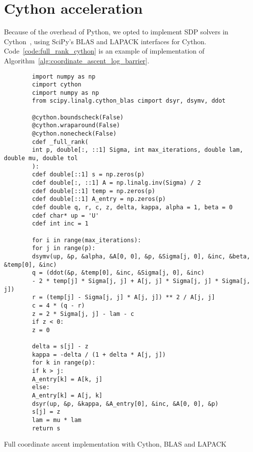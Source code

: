 \chapter{Cython acceleration}\label{ch:cython_acceleration}
Because of the overhead of Python, we opted to implement SDP solvers in Cython~\cite{cython},
using SciPy's BLAS and LAPACK interfaces for Cython.
Code~\ref{code:full_rank_cython} is an example of implementation of Algorithm~\ref{alg:coordinate_ascent_log_barrier}.
\begin{calgorithm}
    \begin{verbatim}
        import numpy as np
        cimport cython
        cimport numpy as np
        from scipy.linalg.cython_blas cimport dsyr, dsymv, ddot

        @cython.boundscheck(False)
        @cython.wraparound(False)
        @cython.nonecheck(False)
        cdef _full_rank(
        int p, double[:, ::1] Sigma, int max_iterations, double lam, double mu, double tol
        ):
        cdef double[::1] s = np.zeros(p)
        cdef double[:, ::1] A = np.linalg.inv(Sigma) / 2
        cdef double[::1] temp = np.zeros(p)
        cdef double[::1] A_entry = np.zeros(p)
        cdef double q, r, c, z, delta, kappa, alpha = 1, beta = 0
        cdef char* up = 'U'
        cdef int inc = 1

        for i in range(max_iterations):
        for j in range(p):
        dsymv(up, &p, &alpha, &A[0, 0], &p, &Sigma[j, 0], &inc, &beta, &temp[0], &inc)
        q = (ddot(&p, &temp[0], &inc, &Sigma[j, 0], &inc)
        - 2 * temp[j] * Sigma[j, j] + A[j, j] * Sigma[j, j] * Sigma[j, j])
        r = (temp[j] - Sigma[j, j] * A[j, j]) ** 2 / A[j, j]
        c = 4 * (q - r)
        z = 2 * Sigma[j, j] - lam - c
        if z < 0:
        z = 0

        delta = s[j] - z
        kappa = -delta / (1 + delta * A[j, j])
        for k in range(p):
        if k > j:
        A_entry[k] = A[k, j]
        else:
        A_entry[k] = A[j, k]
        dsyr(up, &p, &kappa, &A_entry[0], &inc, &A[0, 0], &p)
        s[j] = z
        lam = mu * lam
        return s
    \end{verbatim}
    \caption{
        Full coordinate ascent implementation with Cython, BLAS and LAPACK
    }\label{code:full_rank_cython}
\end{calgorithm}
